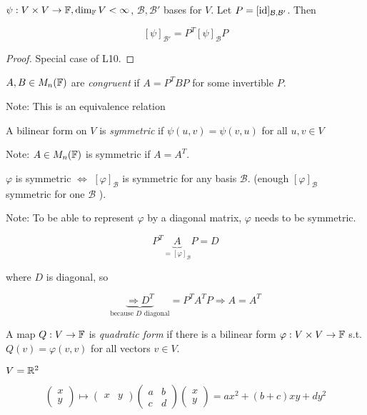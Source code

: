 \documentclass[a4paper]{article}
\begin{document}
\begin{lemma} 
	$ \psi : V \times V \to \mathbb{F}, \dim_{\mathbb{F}} V < \infty $, $ \mathcal{B},\mathcal{B}' $ bases for $ V $. Let $ P = [\operatorname{id}]_{\mathcal{B},\mathcal{B}'} $. Then
	
	\[ [\psi]_{\mathcal{B'}} = P^{T} [\psi]_{\mathcal{B}} P \]
\end{lemma}

\begin{proof}
	Special case of L10.
\end{proof}


\begin{defi}
	$ A,B \in M_{n}(\mathbb{F}) $ are \emph{congruent} if $ A = P^{T} B P $ for some invertible $ P $. 
\end{defi}

Note: This is an equivalence relation

\begin{defi}
	A bilinear form on $ V $ is \emph{symmetric} if $ \psi(u,v) = \psi(v,u) $ for all $ u,v \in V $
\end{defi}

Note: $ A \in M_{n}(\mathbb{F}) $ is symmetric if $ A = A^{T} $.

$ \varphi $ is symmetric $ \iff $ $ [\varphi]_{\mathcal{B}} $ is symmetric for any basis $ \mathcal{B} $. (enough $ [\varphi]_{\mathcal{B}} $ symmetric for one $ \mathcal{B} $ ).

Note: To be able to represent $ \varphi $ by a diagonal matrix, $ \varphi $ needs to be symmetric. 

\[ P^{T} \underbrace{A}_{= [ \varphi ]_{\mathcal{B}}} P = D \]

where $ D $ is diagonal, so 

\[ \underbrace{\Rightarrow D^{T}}_{\text{because } D \text{ diagonal}} = P^{T} A^{T} P \Rightarrow A = A^{T}  \]

\begin{defi}
	A map $ Q : V \to \mathbb{F} $ is \emph{quadratic form} if there is a bilinear form $ \varphi: V \times V \to \mathbb{F}  $ s.t. $ Q(v)= \varphi(v,v)  $ for all vectors $ v \in V $.
\end{defi}


\begin{eg}
	$ V = \mathbb{R}^{2} $
	
	
	\[ \begin{pmatrix}
	x\\
	y
	\end{pmatrix}  \mapsto \begin{pmatrix}
	x & y
	\end{pmatrix} \begin{pmatrix}
	a & b\\
	c & d
	\end{pmatrix} \begin{pmatrix}
	x \\
	y
	\end{pmatrix} = ax^{2} + (b+c)xy + dy^{2}  \]
\end{eg}
\end{document}
